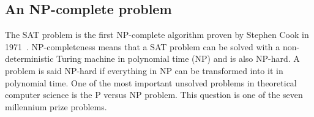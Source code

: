 %

\subsection{An NP-complete problem}
The SAT problem is the first NP-complete algorithm proven by Stephen Cook in 1971~\cite{cook1971complexity}.
NP-completeness means that a SAT problem can be solved with a non-deterministic Turing machine in polynomial time (NP) and is also NP-hard. A problem is said NP-hard if everything in NP can be transformed into it in polynomial time. 
One of the most important unsolved problems in theoretical computer science is the P versus NP problem.
This question is one of the seven millennium prize problems.


